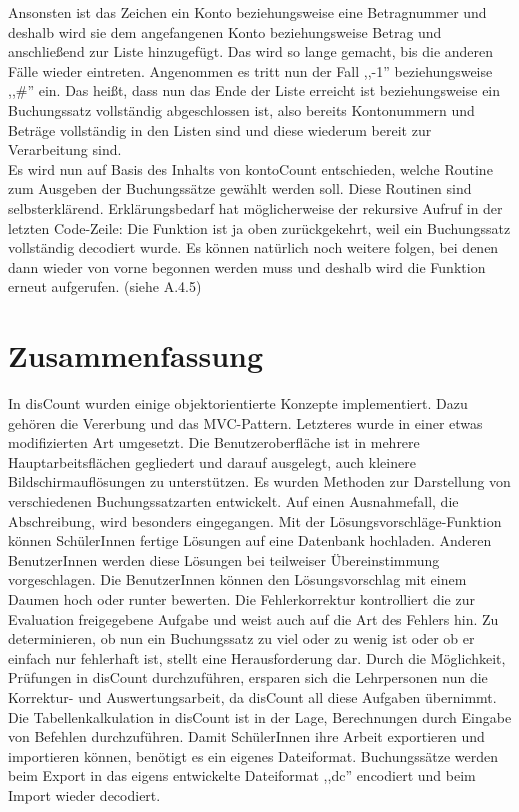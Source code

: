 \documentclass[12pt]{report}
\begin{document}
\noindent Ansonsten ist das Zeichen ein Konto beziehungsweise eine Betragnummer und deshalb wird sie dem angefangenen Konto beziehungsweise Betrag und anschließend zur Liste hinzugefügt. Das wird so lange gemacht, bis die anderen Fälle wieder eintreten. Angenommen es tritt nun der Fall ,,-1'' beziehungsweise ,,\#'' ein. Das heißt, dass nun das Ende der Liste erreicht ist beziehungsweise ein Buchungssatz vollständig abgeschlossen ist, also bereits Kontonummern und Beträge vollständig in den Listen sind und diese wiederum bereit zur Verarbeitung sind.\\



\noindent Es wird nun auf Basis des Inhalts von kontoCount entschieden, welche Routine zum Ausgeben der Buchungssätze gewählt werden soll. Diese Routinen sind selbsterklärend. Erklärungsbedarf hat möglicherweise der rekursive Aufruf in der letzten Code-Zeile: Die Funktion ist ja oben zurückgekehrt, weil ein Buchungssatz vollständig decodiert wurde. Es können natürlich noch weitere folgen, bei denen dann wieder von vorne begonnen werden muss und deshalb wird die Funktion erneut aufgerufen. (siehe A.4.5)
\newpage




\section*{Zusammenfassung} 
\rhead{}
 
In disCount wurden einige objektorientierte Konzepte implementiert. Dazu gehören die Vererbung und das MVC-Pattern. Letzteres wurde in einer etwas modifizierten Art umgesetzt. Die Benutzeroberfläche ist in mehrere Hauptarbeitsflächen gegliedert und darauf ausgelegt, auch kleinere Bildschirmauflösungen zu unterstützen. Es wurden Methoden zur Darstellung von verschiedenen Buchungssatzarten entwickelt. Auf einen Ausnahmefall, die Abschreibung, wird besonders eingegangen. Mit der Lösungsvorschläge-Funktion können SchülerInnen fertige Lösungen auf eine Datenbank hochladen. Anderen BenutzerInnen werden diese Lösungen bei teilweiser Übereinstimmung vorgeschlagen. Die BenutzerInnen können den Lösungsvorschlag mit einem Daumen hoch oder runter bewerten. Die Fehlerkorrektur kontrolliert die zur Evaluation freigegebene Aufgabe und weist auch auf die Art des Fehlers hin. Zu determinieren, ob nun ein Buchungssatz zu viel oder zu wenig ist oder ob er einfach nur fehlerhaft ist, stellt eine Herausforderung dar. Durch die Möglichkeit, Prüfungen in disCount durchzuführen, ersparen sich die Lehrpersonen nun die Korrektur- und Auswertungsarbeit, da disCount all diese Aufgaben übernimmt. Die Tabellenkalkulation in disCount ist in der Lage, Berechnungen durch Eingabe von Befehlen durchzuführen. Damit SchülerInnen ihre Arbeit exportieren und importieren können, benötigt es ein eigenes Dateiformat. Buchungssätze werden beim Export in das eigens entwickelte Dateiformat ,,dc'' encodiert und beim Import wieder decodiert.
\end{document}
